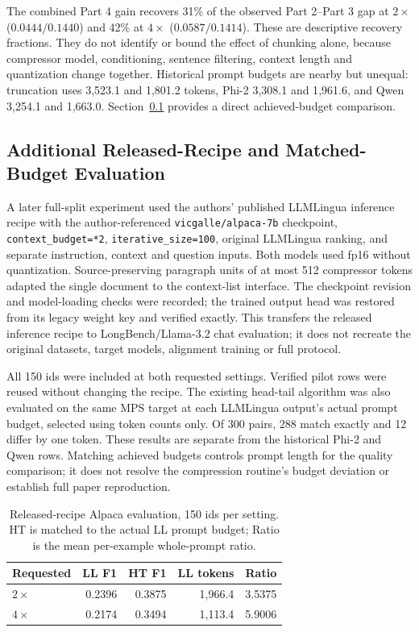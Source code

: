 ﻿\documentclass[10pt,a4paper,twocolumn]{article}
\begin{document}
The combined Part 4 gain recovers 31\% of the observed Part 2--Part 3 gap at
$2\times$ ($0.0444/0.1440$) and 42\% at $4\times$ ($0.0587/0.1414$).
These are descriptive recovery fractions. They do not identify or bound the
effect of chunking alone, because compressor model, conditioning, sentence
filtering, context length and quantization change together. Historical prompt
budgets are nearby but unequal: truncation uses 3{,}523.1 and 1{,}801.2 tokens,
Phi-2 3{,}308.1 and 1{,}961.6, and Qwen 3{,}254.1 and 1{,}663.0.
Section~\ref{sec:matched} provides a direct achieved-budget comparison.

\subsection{Additional Released-Recipe and Matched-Budget Evaluation}
\label{sec:matched}

A later full-split experiment used the authors' published LLMLingua inference
recipe with the author-referenced \texttt{vicgalle/alpaca-7b} checkpoint,
\texttt{context\_budget=*2}, \texttt{iterative\_size=100}, original LLMLingua
ranking, and separate instruction, context and question inputs. Both models used
fp16 without quantization. Source-preserving paragraph units of at most 512
compressor tokens adapted the single document to the context-list interface.
The checkpoint revision and model-loading checks were recorded; the trained output
head was restored from its legacy weight key and verified exactly. This transfers
the released inference recipe to LongBench/Llama-3.2 chat evaluation; it does not
recreate the original datasets, target models, alignment training or full protocol.

All 150 ids were included at both requested settings. Verified pilot rows were
reused without changing the recipe. The existing head-tail algorithm was also
evaluated on the same MPS target at each LLMLingua output's actual prompt budget,
selected using token counts only. Of 300 pairs, 288 match exactly and 12 differ
by one token. These results are separate from the historical Phi-2 and Qwen rows. Matching achieved budgets controls prompt length for the quality comparison; it does not resolve the compression routine's budget deviation or establish full paper reproduction.

\begin{table}[t]
\centering\footnotesize
\setlength{\tabcolsep}{3pt}
\begin{tabular}{lrrrr}
\toprule
Requested & LL F1 & HT F1 & LL tokens & Ratio \\
\midrule
$2\times$ & 0.2396 & 0.3875 & 1{,}966.4 & 3.5375 \\
$4\times$ & 0.2174 & 0.3494 & 1{,}113.4 & 5.9006 \\
\bottomrule
\end{tabular}
\caption{Released-recipe Alpaca evaluation, 150 ids per setting. HT is matched
to the actual LL prompt budget; Ratio is the mean per-example whole-prompt ratio.}
\label{tab:matched}
\end{table}
\end{document}
